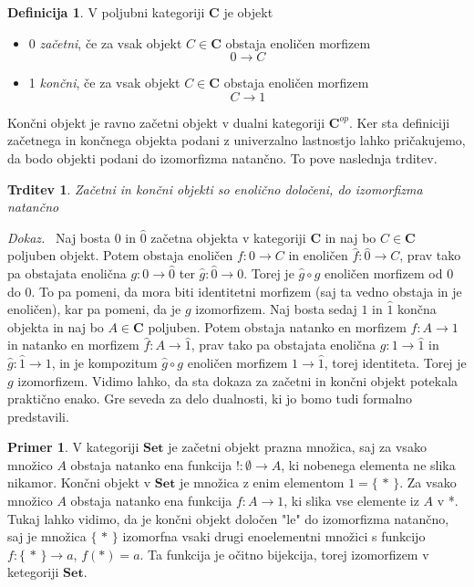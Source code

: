 \documentclass[12pt,a4paper]{book}
\theoremstyle{definition}
\newtheorem{definicija}{Definicija}[chapter]
\theoremstyle{plain}
\newtheorem{trditev}{Trditev}[izrek]
\newenvironment{dokaz}{\emph{Dokaz.}\ }{\hspace{\fill}{$\Box$}}
\theoremstyle{definition}
\newtheorem{primer}{Primer}[section]
\theoremstyle{remark}
\newcommand{\cat}[1]{\textbf{#1}}
\newcommand{\set}[1]{\{\,#1\,\}}
\begin{document}
\begin{definicija}
V poljubni kategoriji $\cat{C}$ je objekt
\begin{itemize}
\item[] 0 \textit{začetni}, če za vsak objekt $C \in \cat{C}$ obstaja enoličen morfizem $$0 \to C$$
\item[] 1 \textit{končni}, če za vsak objekt $C \in \cat{C}$ obstaja enoličen morfizem $$C \to 1$$
\end{itemize}
\end{definicija}
Končni objekt je ravno začetni objekt v dualni kategoriji $\cat{C}^{op}$. Ker sta definiciji začetnega in končnega objekta podani z univerzalno lastnostjo lahko pričakujemo, da bodo objekti podani do izomorfizma natančno. To pove naslednja trditev.

\begin{trditev}
Začetni in končni objekti so enolično določeni, do izomorfizma natančno
\end{trditev}
\begin{dokaz}
Naj bosta $0$ in $\hat{0}$ začetna objekta v kategoriji $\cat{C}$ in naj bo $C \in \cat{C}$ poljuben objekt. Potem obstaja enoličen $f : 0 \to C$ in enoličen $\hat{f} : \hat{0} \to C$, prav tako pa obstajata enolična $g : 0 \to \hat{0}$ ter $\hat{g} : \hat{0} \to 0$. Torej je $\hat{g} \circ g$ enoličen morfizem od 0 do 0. To pa pomeni, da mora biti identitetni morfizem (saj ta vedno obstaja in je enoličen), kar pa pomeni, da je $g$ izomorfizem.
Naj bosta sedaj $1$ in $\hat{1}$ končna objekta in naj bo $A \in \cat{C}$ poljuben. Potem obstaja natanko en morfizem $f : A \to 1$ in natanko en morfizem $\hat{f} : A \to \hat{1}$, prav tako pa obstajata enolična $g : 1 \to \hat{1}$ in $\hat{g} : \hat{1} \to 1$, in je kompozitum $\hat{g} \circ g$ enoličen morfizem $1 \to \hat{1}$, torej identiteta. Torej je $g$ izomorfizem.
\end{dokaz}
Vidimo lahko, da sta dokaza za začetni in končni objekt potekala praktično enako. Gre seveda za delo dualnosti, ki jo bomo tudi formalno predstavili.

\begin{primer}
V kategoriji $\cat{Set}$ je začetni objekt prazna množica, saj za vsako množico $A$ obstaja natanko ena funkcija $! : \emptyset \to A$, ki nobenega elementa ne slika nikamor. Končni objekt v $\cat{Set}$ je množica z enim elementom $1 = \set{*}$. Za vsako množico $A$ obstaja natanko ena funkcija $f : A \to 1$, ki slika vse elemente iz $A$ v *. Tukaj lahko vidimo, da je končni objekt določen "le" do izomorfizma natančno, saj je množica $\set{*}$ izomorfna vsaki drugi enoelementni množici s funkcijo $f : \set{*} \to {a}$, $f(*) = a$. Ta funkcija je očitno bijekcija, torej izomorfizem v ketegoriji $\cat{Set}$.
\end{primer}
\end{document}
